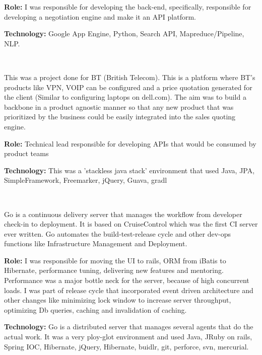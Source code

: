\begin{resume}
\begin{position}
{\textbf{Role:}} I was responsible for developing the back-end, specifically, responsible for developing a negotiation engine and make it an API platform.

{\textbf{Technology:}} Google App Engine, Python, Search API, Mapreduce/Pipeline, NLP. 
\end{position}\\

\begin{position}
This was a project done for  BT (British Telecom). This is a platform where BT's products like VPN, VOIP can be configured and a price quotation generated for the client (Similar to configuring laptops on dell.com). The aim was to build a backbone in
a product agnostic manner so that any new product that was prioritized by the business could be easily integrated into the sales quoting engine.

{\textbf{Role:}} Technical lead responsible for developing APIs that would be consumed by product teams

{\textbf{Technology:}} This was a 'stackless java stack' environment that used Java, JPA, SimpleFramework, Freemarker, jQuery, Guava, gradl
\end{position}\\

\begin{position}
Go is a continuous delivery server that manages the workflow from developer check-in to deployment. It is based on CruiseControl which was the first CI server ever written. Go automates the build-test-release cycle and other dev-ops functions like Infrastructure Management and Deployment.

{\textbf{Role:}} I was responsible for moving the UI to rails, ORM from iBatis to Hibernate, performance tuning, delivering new features and mentoring. Performance was a major bottle neck for the server, because of high concurrent loads. I was part of release cycle that incorporated event driven architecture and other changes like minimizing lock window to increase server throughput, optimizing Db queries, caching and invalidation of caching. 

{\textbf{Technology:}} Go is a distributed server that manages several agents that do the actual work. It was a very ploy-glot environment and used Java, JRuby on rails, Spring IOC, Hibernate, jQuery, Hibernate, buidlr, git, perforce, svn, mercurial.
\end{position}\\



\end{resume}
